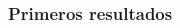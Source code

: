 \documentclass{beamer}
\begin{document}
\begin{frame}
				\frametitle{Primeros resultados}
	\begin{columns}
		\begin{column}{0.50\textwidth}
		\end{column} 
	 	\begin{column}{0.5\textwidth}
	 \end{column}
	\end{columns}
\end{frame}
\end{document}
